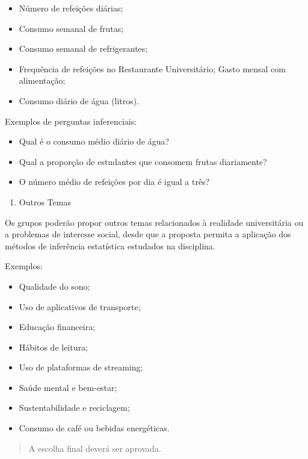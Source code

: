 \documentclass[
  letterpaper,
  DIV=11,
  numbers=noendperiod]{scrreprt}
\providecommand{\tightlist}{%
  \setlength{\itemsep}{0pt}\setlength{\parskip}{0pt}}\usepackage{longtable,booktabs,array}
\begin{document}
\begin{itemize}
\tightlist
\item
  Número de refeições diárias;
\item
  Consumo semanal de frutas;
\item
  Consumo semanal de refrigerantes;
\item
  Frequência de refeições no Restaurante Universitário; Gasto mensal com
  alimentação;
\item
  Consumo diário de água (litros).
\end{itemize}

Exemplos de perguntas inferenciais:

\begin{itemize}
\tightlist
\item
  Qual é o consumo médio diário de água?
\item
  Qual a proporção de estudantes que consomem frutas diariamente?
\item
  O número médio de refeições por dia é igual a três?
\end{itemize}

\begin{enumerate}
\def\labelenumi{\arabic{enumi}.}
\setcounter{enumi}{5}
\tightlist
\item
  Outros Temas
\end{enumerate}

Os grupos poderão propor outros temas relacionados à realidade
universitária ou a problemas de interesse social, desde que a proposta
permita a aplicação dos métodos de inferência estatística estudados na
disciplina.

Exemplos:

\begin{itemize}
\tightlist
\item
  Qualidade do sono;
\item
  Uso de aplicativos de transporte;
\item
  Educação financeira;
\item
  Hábitos de leitura;
\item
  Uso de plataformas de streaming;
\item
  Saúde mental e bem-estar;
\item
  Sustentabilidade e reciclagem;
\item
  Consumo de café ou bebidas energéticas.
\end{itemize}

\begin{quote}
A escolha final deverá ser aprovada.
\end{quote}
\end{document}
